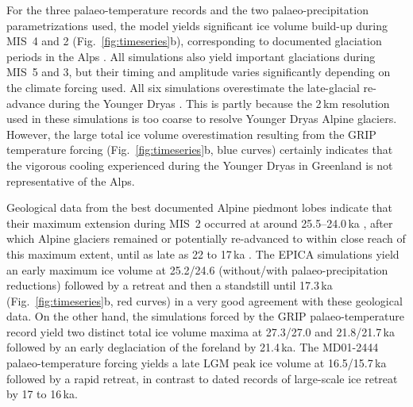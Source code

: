 \documentclass[tc, manuscript]{copernicus}
\begin{document}
    For the three palaeo-temperature records and the two palaeo-precipitation
    parametrizations used, the model yields significant ice volume build-up
    during MIS~4 and 2 (Fig.~\ref{fig:timeseries}b), corresponding to documented
    glaciation periods in the Alps \citep{Preusser.2004, Ivy-Ochs.etal.2008}.
    All simulations also yield important glaciations during MIS~5 and 3, but
    their timing and amplitude varies significantly depending on the climate
    forcing used. All six simulations overestimate the late-glacial re-advance
    during the Younger Dryas
    \citep[12.9--11.7\,ka; cf. e.g.,][]{Ivy-Ochs.etal.2009}.
    This is partly because the 2\,km resolution used in these simulations is
    too coarse to resolve
    Younger Dryas Alpine glaciers. However, the large total ice volume
    overestimation resulting from the GRIP temperature forcing
    (Fig.~\ref{fig:timeseries}b, blue curves) certainly indicates that the
    vigorous cooling experienced during the Younger Dryas in Greenland is not
    representative of the Alps.

    Geological data from the best documented Alpine piedmont lobes indicate
    that their maximum extension during MIS~2 occurred at around 25.5--24.0\,ka
    \citep{Monegato.etal.2017}, after which Alpine glaciers remained or
    potentially re-advanced to within close reach of this maximum extent, until
    as late as 22 to 17\,ka \citep[Fig.~5]{Ivy-Ochs.2015, Wirsig.etal.2016}.
    The EPICA simulations yield an
    early maximum ice volume at 25.2/24.6 (without/with palaeo-precipitation
    reductions) followed by a retreat and then a standstill until 17.3\,ka
    (Fig.~\ref{fig:timeseries}b, red curves) in a very good agreement with
    these geological data. On the other hand, the simulations forced by the
    GRIP palaeo-temperature record yield two distinct total ice volume maxima
    at 27.3/27.0 and 21.8/21.7\,ka followed by an early deglaciation of the
    foreland by 21.4\,ka. The MD01-2444 palaeo-temperature forcing yields
    a late LGM peak ice volume at 16.5/15.7\,ka followed by a rapid retreat,
    in contrast to dated records of large-scale ice retreat by 17 to
    16\,ka\citep{Ivy-Ochs.etal.2006, Ivy-Ochs.etal.2008}.
\end{document}
